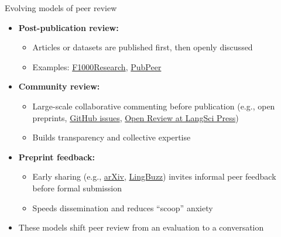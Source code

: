 \documentclass[aspectratio=169]{beamer}
\begin{document}
\begin{frame}{Evolving models of peer review}
\begin{itemize}

  \item \textbf{Post-publication review:}
    \begin{itemize}
      \item Articles or datasets are published first, then openly discussed
      \item Examples: 
        \href{https://f1000research.com/}{F1000Research}, 
        \href{https://pubpeer.com/}{PubPeer}
    \end{itemize}

  \item \textbf{Community review:}
    \begin{itemize}
      \item Large-scale collaborative commenting before publication  
            (e.g., open preprints, \href{https://github.com/}{GitHub issues}, \href{https://langsci-press.org/openReview/intro}{Open Review at LangSci Press})
      \item Builds transparency and collective expertise
    \end{itemize}

  \item \textbf{Preprint feedback:}
    \begin{itemize}
      \item Early sharing (e.g., \href{https://arxiv.org/}{arXiv}, 
            \href{https://ling.auf.net/lingbuzz}{LingBuzz}) invites informal peer feedback before formal submission
      \item Speeds dissemination and reduces ``scoop'' anxiety
    \end{itemize}

  \item These models shift peer review from an evaluation to a 
       conversation
\end{itemize}

\end{frame}
\end{document}
